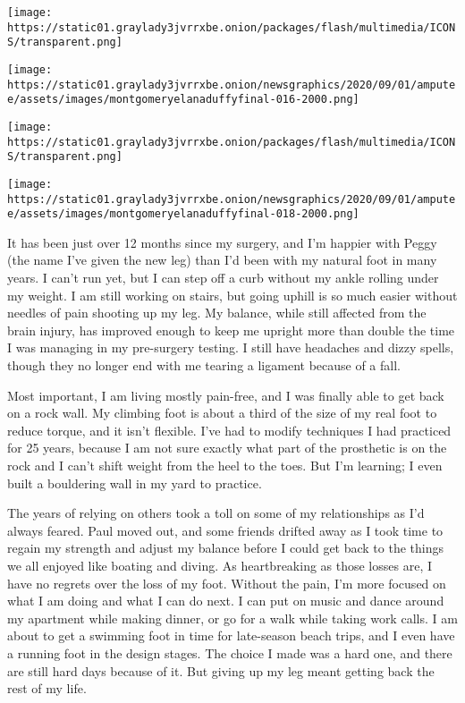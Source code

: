 \texttt{[image: https://static01.graylady3jvrrxbe.onion/packages/flash/multimedia/ICONS/transparent.png]}

\texttt{[image: https://static01.graylady3jvrrxbe.onion/newsgraphics/2020/09/01/amputee/assets/images/montgomeryelanaduffyfinal-016-2000.png]}

\texttt{[image: https://static01.graylady3jvrrxbe.onion/packages/flash/multimedia/ICONS/transparent.png]}

\texttt{[image: https://static01.graylady3jvrrxbe.onion/newsgraphics/2020/09/01/amputee/assets/images/montgomeryelanaduffyfinal-018-2000.png]}

It has been just over 12 months since my surgery, and I'm happier with
Peggy (the name I've given the new leg) than I'd been with my natural
foot in many years. I can't run yet, but I can step off a curb without
my ankle rolling under my weight. I am still working on stairs, but
going uphill is so much easier without needles of pain shooting up my
leg. My balance, while still affected from the brain injury, has
improved enough to keep me upright more than double the time I was
managing in my pre-surgery testing. I still have headaches and dizzy
spells, though they no longer end with me tearing a ligament because of
a fall.

Most important, I am living mostly pain-free, and I was finally able to
get back on a rock wall. My climbing foot is about a third of the size
of my real foot to reduce torque, and it isn't flexible. I've had to
modify techniques I had practiced for 25 years, because I am not sure
exactly what part of the prosthetic is on the rock and I can't shift
weight from the heel to the toes. But I'm learning; I even built a
bouldering wall in my yard to practice.

The years of relying on others took a toll on some of my relationships
as I'd always feared. Paul moved out, and some friends drifted away as I
took time to regain my strength and adjust my balance before I could get
back to the things we all enjoyed like boating and diving. As
heartbreaking as those losses are, I have no regrets over the loss of my
foot. Without the pain, I'm more focused on what I am doing and what I
can do next. I can put on music and dance around my apartment while
making dinner, or go for a walk while taking work calls. I am about to
get a swimming foot in time for late-season beach trips, and I even have
a running foot in the design stages. The choice I made was a hard one,
and there are still hard days because of it. But giving up my leg meant
getting back the rest of my life.

